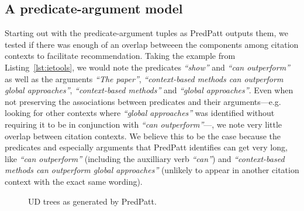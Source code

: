 \subsection{A predicate-argument model}
Starting out with the predicate-argument tuples as PredPatt outputs them, we tested if there was enough of an overlap betweeen the components among citation contexts to facilitate recommendation. Taking the example from Listing~\ref{lst:ietools}, we would note the predicates \emph{``show''} and \emph{``can outperform''} as well as the arguments \emph{``The paper''}, \emph{``context-based methods can outperform global approaches''}, \emph{``context-based methods''} and \emph{``global approaches''}. Even when not preserving the associations between predicates and their arguments---e.g. looking for other contexts where \emph{``global approaches''} was identified without requiring it to be in conjunction with \emph{``can outperform''}---, we note very little overlap between citation contexts. We believe this to be the case because the predicates and especially arguments that PredPatt identifies can get very long, like \emph{``can outperform''} (including the auxilliary verb \emph{``can''}) and \emph{``context-based methods can outperform global approaches''} (unlikely to appear in another citation context with the exact same wording).

\begin{figure}
  \centering
  \caption{UD trees as generated by PredPatt.}
  \label{fig:pptrees}
\end{figure}

